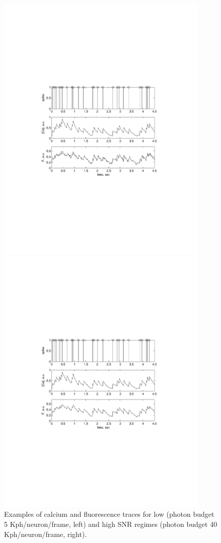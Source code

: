 \begin{figure}
\centering
\begin{minipage}[c]{0.49\hsize}
\includegraphics[width=4in]{../figs/Figure0b_fluor_eg_hlowSNR}
\end{minipage}
\begin{minipage}[c]{0.49\hsize}
\includegraphics[width=4in]{../figs/Figure0a_fluor_eg_highSNR}
\end{minipage}
\caption{Examples of calcium and fluorescence traces for low (photon budget 5 Kph/neuron/frame, left)
and high SNR regimes (photon budget 40 Kph/neuron/frame, right).}
\label{fig:egfluor}
\end{figure}
